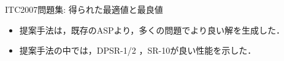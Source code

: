 \documentclass[11pt,dvipdfmx]{beamer}
\begin{document}
\begin{frame}{ITC2007問題集: 得られた最適値と最良値}
\begin{center}
  \begin{tableA}
    
  \end{tableA}
  \end{center}
  \begin{itemize}\small
  \item 提案手法は，既存のASPより，多くの問題でより良い解を生成した．
  \item 提案手法の中では，\textsf{DPSR-1/2} ，\textsf{SR-10}が良い性能を示した．
  \end{itemize}
\end{frame}
\end{document}
